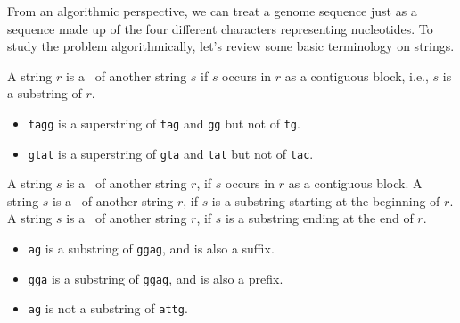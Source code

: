 \begin{cluster}
\label{grp:grm:genome::basic-terminology-on-strings}

\begin{gram}
\label{grm:genome::basic-terminology-on-strings}
From an algorithmic perspective, we can treat a genome sequence just
as a sequence made up of the four different characters representing
nucleotides.
To study the problem algorithmically, let's review some basic
terminology on strings.

\end{gram}
\end{cluster}

\begin{flex}
\label{grp:def:genome::superstring}

\begin{definition}[Superstring]
\label{def:genome::superstring}
A string $r$ is a~ of another string $s$ if $s$
occurs in $r$ as a contiguous block, i.e., $s$ is a substring of $r$.

\end{definition}

\begin{example}
\label{xmpl:genome::tagg}
\begin{itemize}
\item
\texttt{tagg} is a superstring of \texttt{tag} and \texttt{gg} but not
of \texttt{tg}.

\item
\texttt{gtat} is a superstring of \texttt{gta} and \texttt{tat} but not
of \texttt{tac}.
 
\end{itemize}

\end{example}
\end{flex}

\begin{flex}
\label{grp:def:genome::substring-prefix-suffix}

\begin{definition}
\label{def:genome::substring-prefix-suffix}
A string $s$ is a~ of another string $r$, if $s$ occurs
in $r$ as a contiguous block.
A string $s$ is a~ of another string $r$, if $s$ is a substring
starting at the beginning of $r$.
A string $s$ is a~ of another string $r$, if $s$ is a substring
ending at the end of $r$.

\end{definition}

\begin{example}
\label{xmpl:genome::substring}
\begin{itemize}
\item
\texttt{ag} is a substring of \texttt{ggag}, and is also a suffix. 
\item
\texttt{gga} is a substring of \texttt{ggag}, and is also a prefix.
\item
\texttt{ag} is not a substring of \texttt{attg}.
\end{itemize}

\end{example}
\end{flex}


